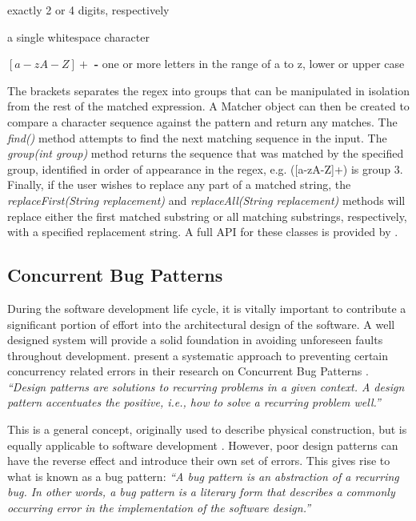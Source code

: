 \documentclass[a4paper,12pt]{article}
\begin{document}
\begin{description}
    \item[ $\setminus d\{2\}, \setminus d\{4\}$ -] exactly 2 or 4 digits, respectively
    \item[ $\setminus s $ -] a single whitespace character
    \item $[a-zA-Z]+$ \textbf{-} one or more letters in the range of a to z, lower or upper case
\end{description}

The brackets separates the regex into groups that can be manipulated in isolation from the rest of the matched expression. A Matcher object can then be created to compare a character sequence against the pattern and return any matches. The \textit{find()} method attempts to find the next matching sequence in the input. The \textit{group(int group)} method returns the sequence that was matched by the specified group, identified in order of appearance in the regex, e.g. ([a-zA-Z]+) is group 3. Finally, if the user wishes to replace any part of a matched string, the \textit{replaceFirst(String replacement)} and \textit{replaceAll(String replacement)} methods will replace either the first matched substring or all matching substrings, respectively, with a specified replacement string. A full API for these classes is provided by \citet{regex_package19}.


\subsection{Concurrent Bug Patterns}\label{section:Concurrent Bug Patterns}

During the software development life cycle, it is vitally important to contribute a significant portion of effort into the architectural design of the software. A well designed system will provide a solid foundation in avoiding unforeseen faults throughout development. \citet{farchi03} present a systematic approach to preventing certain concurrency related errors in their research on Concurrent Bug Patterns \citep{farchi03}. \textit{“Design patterns are solutions to recurring problems in a given context. A design pattern accentuates the positive, i.e., how to solve a recurring problem well.”} 

This is a general concept, originally used to describe physical construction, but is equally applicable to software development \citep{gamma15}. However, poor design patterns can have the reverse effect and introduce their own set of errors. This gives rise to what is known as a bug pattern: \textit{“A bug pattern is an abstraction of a recurring bug. In other words, a bug pattern is a literary form that describes a commonly occurring error in the implementation of the software design.”}
\end{document}
